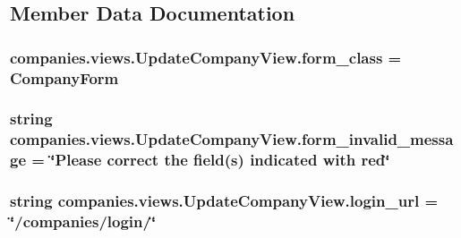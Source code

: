 \subsection{Member Data Documentation}
\hypertarget{classcompanies_1_1views_1_1_update_company_view_a07c5f51455b01027be26705f902cdf5a}{
\subsubsection[{form\-\_\-class}]{\setlength{\rightskip}{0pt plus 5cm}companies.\-views.\-Update\-Company\-View.\-form\-\_\-class = Company\-Form\hspace{0.3cm}{\ttfamily [static]}}}\label{classcompanies_1_1views_1_1_update_company_view_a07c5f51455b01027be26705f902cdf5a}
\hypertarget{classcompanies_1_1views_1_1_update_company_view_a7cb7469cb8a9113e120d0ff7edfb3498}{
\subsubsection[{form\-\_\-invalid\-\_\-message}]{\setlength{\rightskip}{0pt plus 5cm}string companies.\-views.\-Update\-Company\-View.\-form\-\_\-invalid\-\_\-message = \char`\"{}Please correct the field({\bf s}) indicated with red\char`\"{}\hspace{0.3cm}{\ttfamily [static]}}}\label{classcompanies_1_1views_1_1_update_company_view_a7cb7469cb8a9113e120d0ff7edfb3498}
\hypertarget{classcompanies_1_1views_1_1_update_company_view_abbfb2bd77675e281f56ad0b56dc1f235}{
\subsubsection[{login\-\_\-url}]{\setlength{\rightskip}{0pt plus 5cm}string companies.\-views.\-Update\-Company\-View.\-login\-\_\-url = \char`\"{}/companies/login/\char`\"{}\hspace{0.3cm}{\ttfamily [static]}}}\label{classcompanies_1_1views_1_1_update_company_view_abbfb2bd77675e281f56ad0b56dc1f235}
